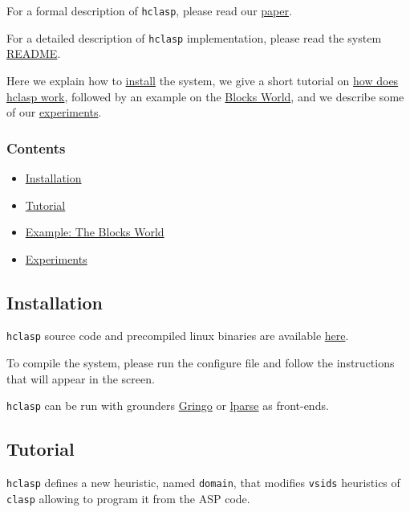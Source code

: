  For a formal description of \texttt{hclasp}, please read our \href{http://www.cs.uni-potsdam.de/wv/pdfformat/gekaotroscwa13a.pdf}{paper}. 

For a detailed description of \texttt{hclasp} implementation,  please read the system \href{text/hclasp-README}{README}.

 Here we explain how to  \hyperlink{install}{install} the system,  we give a short tutorial on \hyperlink{howto}{how does hclasp work},  followed by an example on the \hyperlink{bw}{Blocks World},  and we describe some of our \hyperlink{experiments}{experiments}. 

\subsubsection{Contents}
\begin{itemize}
	\item \hyperlink{install}{Installation}
	\item \hyperlink{howto}{Tutorial}
	\item \hyperlink{bw}{Example: The Blocks World}
	\item \hyperlink{experiments}{Experiments}
\end{itemize}

\subsection{Installation}

\texttt{hclasp} source code and precompiled linux binaries are available \href{http://sourceforge.net/projects/potassco/files/hclasp}{here}.  

To compile the system, please run the configure file and follow the instructions that will appear in the screen.  

\texttt{hclasp} can be run with grounders \href{http://potassco.sourceforge.net/}{Gringo} or      \href{http://www.tcs.hut.fi/Software/smodels/}{lparse} as front-ends. 



\subsection{Tutorial}

\texttt{hclasp} defines a new heuristic, named \texttt{domain},  that modifies \texttt{vsids} heuristics of \texttt{clasp} allowing to program it from the ASP code.  



